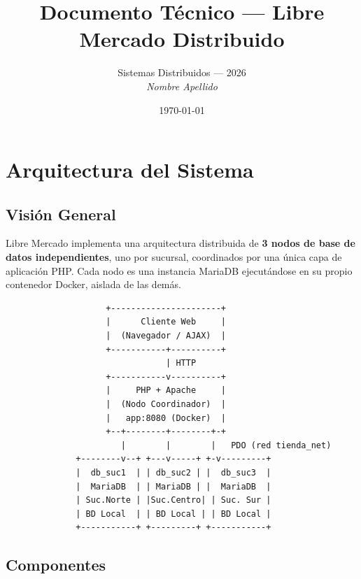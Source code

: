 \documentclass[11pt,a4paper]{article}
\title{\textbf{Documento Técnico --- Libre Mercado Distribuido}}
\author{Sistemas Distribuidos --- 2026 \\ %
\textit{Nombre Apellido}}
\date{\today}
\begin{document}
\maketitle
\tableofcontents
\newpage

\section{Arquitectura del Sistema}

\subsection{Visión General}

Libre Mercado implementa una arquitectura distribuida de \textbf{3 nodos de base de datos independientes}, uno por sucursal, coordinados por una única capa de aplicación PHP. Cada nodo es una instancia MariaDB ejecutándose en su propio contenedor Docker, aislada de las demás.

\begin{lstlisting}
                    +----------------------+
                    |      Cliente Web     |
                    |  (Navegador / AJAX)  |
                    +-----------+----------+
                                | HTTP
                    +-----------v----------+
                    |     PHP + Apache     |
                    |  (Nodo Coordinador)  |
                    |   app:8080 (Docker)  |
                    +--+--------+--------+-+
                       |        |        |   PDO (red tienda_net)
              +--------v--+ +---v-----+ +-v---------+
              |  db_suc1  | | db_suc2 | |  db_suc3  |
              |  MariaDB  | | MariaDB | |  MariaDB  |
              | Suc.Norte | |Suc.Centro| | Suc. Sur |
              | BD Local  | | BD Local | | BD Local |
              +-----------+ +---------+ +-----------+
\end{lstlisting}

\subsection{Componentes}
\end{document}
